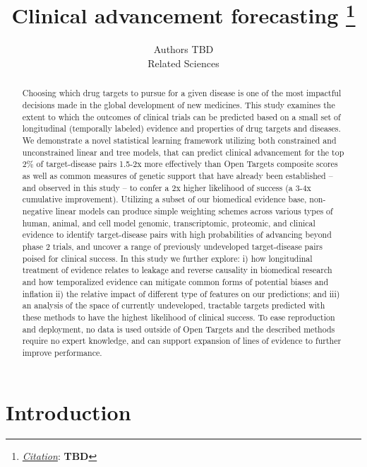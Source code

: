\documentclass{article}
\title{Clinical advancement forecasting
\thanks{\textit{\underline{Citation}}: 
\textbf{TBD}} 
}
\author{
  Authors TBD \\
  Related Sciences \\
}
\begin{document}
\maketitle

\def\evaluationDatasetPairCount{9010}
\def\topRankingPct{2}
\def\bottomRankingPct{98}

\begin{abstract}
Choosing which drug targets to pursue for a given disease is one of the most impactful decisions made in the global development of new medicines. This study examines the extent to which the outcomes of clinical trials can be predicted based on a small set of longitudinal (temporally labeled) evidence and properties of drug targets and diseases. We demonstrate a novel statistical learning framework utilizing both constrained and unconstrained linear and tree models, that can predict clinical advancement for the top \topRankingPct\% of target-disease pairs 1.5-2x more effectively than Open Targets composite scores as well as common measures of genetic support that have already been established -- and observed in this study -- to confer a 2x higher likelihood of success (a 3-4x cumulative improvement). Utilizing a subset of our biomedical evidence base, non-negative linear models can produce simple weighting schemes across various types of human, animal, and cell model genomic, transcriptomic, proteomic, and clinical evidence to identify target-disease pairs with high probabilities of advancing beyond phase 2 trials, and uncover a range of previously undeveloped target-disease pairs poised for clinical success. In this study we further explore: i) how longitudinal treatment of evidence relates to leakage and reverse causality in biomedical research and how temporalized evidence can mitigate common forms of potential biases and inflation ii) the relative impact of different type of features on our predictions; and iii) an analysis of the space of currently undeveloped, tractable targets predicted with these methods to have the highest likelihood of clinical success. To ease reproduction and deployment, no data is used outside of Open Targets and the described methods require no expert knowledge, and can support expansion of lines of evidence to further improve performance.
\end{abstract}

\section{Introduction}
\label{sec:introduction}
\end{document}
